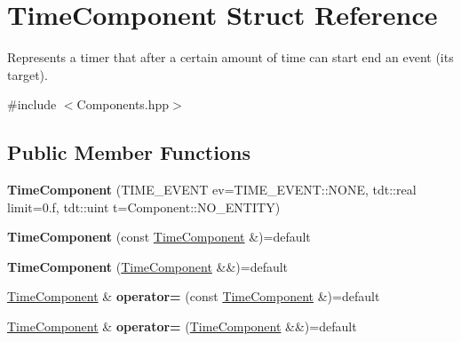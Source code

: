 \hypertarget{struct_time_component}{}\section{Time\+Component Struct Reference}
\label{struct_time_component}


Represents a timer that after a certain amount of time can start end an event (it\textquotesingle{}s target).  




{\ttfamily \#include $<$Components.\+hpp$>$}

\subsection*{Public Member Functions}
\begin{DoxyCompactItemize}
\item 
{\bfseries Time\+Component} (T\+I\+M\+E\+\_\+\+E\+V\+E\+NT ev=T\+I\+M\+E\+\_\+\+E\+V\+E\+N\+T\+::\+N\+O\+NE, tdt\+::real limit=0.f, tdt\+::uint t=Component\+::\+N\+O\+\_\+\+E\+N\+T\+I\+TY)\hypertarget{struct_time_component_a3e1faa284be9f438abc7c6b788ed9931}{}\label{struct_time_component_a3e1faa284be9f438abc7c6b788ed9931}

\item 
{\bfseries Time\+Component} (const \hyperlink{struct_time_component}{Time\+Component} \&)=default\hypertarget{struct_time_component_a887404ba7bd484e3298c8d37db4b6d94}{}\label{struct_time_component_a887404ba7bd484e3298c8d37db4b6d94}

\item 
{\bfseries Time\+Component} (\hyperlink{struct_time_component}{Time\+Component} \&\&)=default\hypertarget{struct_time_component_a166fd13362f30db8f5d870c618855962}{}\label{struct_time_component_a166fd13362f30db8f5d870c618855962}

\item 
\hyperlink{struct_time_component}{Time\+Component} \& {\bfseries operator=} (const \hyperlink{struct_time_component}{Time\+Component} \&)=default\hypertarget{struct_time_component_ae2193813f8f1aefeea6cbc2b7b45dab4}{}\label{struct_time_component_ae2193813f8f1aefeea6cbc2b7b45dab4}

\item 
\hyperlink{struct_time_component}{Time\+Component} \& {\bfseries operator=} (\hyperlink{struct_time_component}{Time\+Component} \&\&)=default\hypertarget{struct_time_component_a2f98207a9b2c35be32305842af7b340c}{}\label{struct_time_component_a2f98207a9b2c35be32305842af7b340c}

\end{DoxyCompactItemize}
